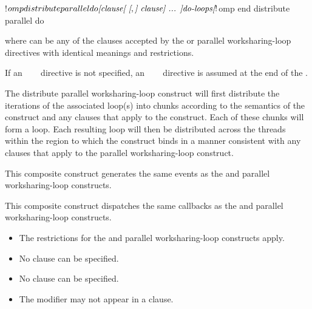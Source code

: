 \begin{fortranspecific}
\begin{ompfPragma}
!$omp distribute parallel do \plc{[clause[ [},\plc{] clause] ... ]}
    \plc{do-loops}
\plc{[}!$omp end distribute parallel do\plc{]}
\end{ompfPragma}

where  can be any of the clauses accepted by the  or 
parallel worksharing-loop directives with identical meanings and restrictions.

If an ~~~ directive is not specified, an
~~~ directive is assumed at the end of the .
\end{fortranspecific}

\descr
The distribute parallel worksharing-loop construct will first distribute the
iterations of the associated loop(s) into chunks according to the semantics of
the  construct and any clauses that apply to the
 construct. Each of these chunks will form a loop. Each
resulting loop will then be distributed across the threads within the
 region to which the  construct binds in a manner 
consistent with any clauses that apply to the parallel worksharing-loop construct.

\events

This composite construct generates the same events as the  and parallel worksharing-loop constructs.

\tools

This composite construct dispatches the same callbacks as the  and parallel worksharing-loop constructs.



\restrictions
\begin{itemize}
\item The restrictions for the  and parallel worksharing-loop constructs apply.
\item No  clause can be specified.
\item No  clause can be specified.
\item The  modifier may not appear in a  clause.
\end{itemize}



